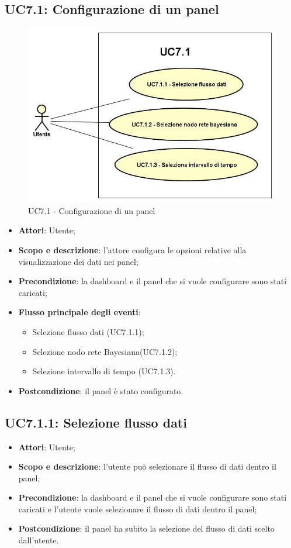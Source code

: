 \subsection{UC7.1: Configurazione di un panel}
\hypertarget{UC7.1}{}
\begin{figure} [H]
	\centering
	\includegraphics[scale=0.45]{Img/UC7-1}
	\caption{UC7.1 - Configurazione di un panel}\label{}
\end{figure}
\begin{itemize}
	\item \textbf{Attori}: Utente;
	\item \textbf{Scopo e descrizione}: l'attore configura le opzioni relative alla visualizzazione dei dati nei panel;
	\item \textbf{Precondizione}: la dashboard e il panel che si vuole configurare sono stati caricati;
	\item \textbf{Flusso principale degli eventi}:
	\begin{itemize}
		\item Selezione flusso dati  (UC7.1.1);
		\item Selezione nodo rete Bayesiana(UC7.1.2);
		\item Selezione intervallo di tempo (UC7.1.3).		
	\end{itemize}
	\item \textbf{Postcondizione}: il panel è stato configurato.
\end{itemize}
\subsection{UC7.1.1: Selezione flusso dati}
\hypertarget{UC7.1.1}{}
\begin{itemize}
	\item \textbf{Attori}: Utente;
	\item \textbf{Scopo e descrizione}: l'utente può selezionare il flusso di dati dentro il panel;
	\item \textbf{Precondizione}: la dashboard e il panel che si vuole configurare sono stati caricati e l'utente vuole selezionare il flusso di dati dentro il panel;
	\item \textbf{Postcondizione}: il panel ha subito la selezione del flusso di dati scelto dall'utente.
\end{itemize}
